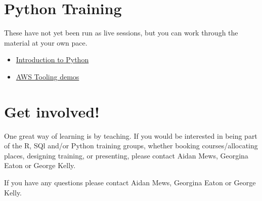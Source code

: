 \documentclass[
]{book}
\providecommand{\tightlist}{%
  \setlength{\itemsep}{0pt}\setlength{\parskip}{0pt}}
\begin{document}
\hypertarget{python-training}{%
\section{Python Training}\label{python-training}}

These have not yet been run as live sessions, but you can work through the material at your own pace.

\begin{itemize}
\tightlist
\item
  \href{https://github.com/moj-analytical-services/intro-to-python}{Introduction to Python}
\item
  \href{https://github.com/moj-analytical-services/mojap-aws-tools-demo}{AWS Tooling demos}
\end{itemize}

\hypertarget{get-involved}{%
\section{Get involved!}\label{get-involved}}

One great way of learning is by teaching. If you would be interested in being part of the R, SQl and/or Python training groups, whether booking courses/allocating places, designing training, or presenting, please contact Aidan Mews, Georgina Eaton or George Kelly.

If you have any questions please contact Aidan Mews, Georgina Eaton or George Kelly.

  
\end{document}

